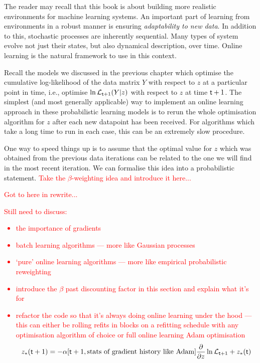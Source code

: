 The reader may recall that this book is about building more realistic environments for machine learning systems. An important part of learning from environments in a robust manner is ensuring \emph{adaptability to new data}. In addition to this, stochastic processes are inherently sequential. Many types of system evolve not just their states, but also dynamical description, over time. Online learning is the natural framework to use in this context.

Recall the models we discussed in the previous chapter which optimise the cumulative log-likelihood of the data matrix $Y$ with respect to $z$ at a particular point in time, i.e., optimise $\ln {\cal L}_{{\sf t}+1}(Y\vert z)$ with respect to $z$ at time ${\sf t}+1$. The simplest (and most generally applicable) way to implement an online learning approach in these probabilistic learning models is to rerun the whole optimisation algorithm for $z$ after each new datapoint has been received. For algorithms which take a long time to run in each case, this can be an extremely slow procedure. 

One way to speed things up is to assume that the optimal value for $z$ which was obtained from the previous data iterations can be related to the one we will find in the most recent iteration. We can formalise this idea into a probabilistic statement. \textcolor{red}{Take the $\beta$-weighting idea and introduce it here...}

\textcolor{red}{Got to here in rewrite...}
\textcolor{red}{Still need to discuss:
\begin{itemize}
\item{the importance of gradients}
\item{batch learning algorithms --- more like Gaussian processes}
\item{`pure' online learning algorithms --- more like empirical probabilistic reweighting}
\item{introduce the $\beta$ past discounting factor in this section and explain what it's for}
\item{refactor the code so that it's always doing online learning under the hood --- this can either be rolling refits in blocks on a refitting schedule with any optimisation algorithm of choice or full online learning Adam optimisation $$z_*({\sf t}+1) = -\alpha [{\sf t}+1,\text{stats of gradient history like Adam}] \frac{\partial}{\partial z} \ln {\cal L}_{{\sf t}+1} + z_*({\sf t})$$}
\end{itemize}}

